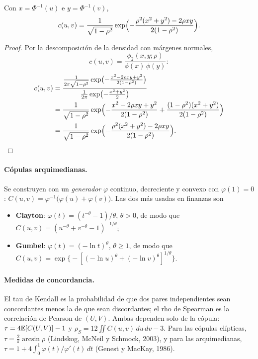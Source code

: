 \begin{proposicion}\label{prop:densgauss}
Con $x=\Phi^{-1}(u)$ e $y=\Phi^{-1}(v)$,
\[
  c(u,v)=\frac{1}{\sqrt{1-\rho^2}}\exp\Bigl(-\frac{\rho^2(x^2+y^2)-2\rho xy}{2(1-\rho^2)}\Bigr).
\]
\end{proposicion}

\begin{proof}
Por la descomposición de la densidad con márgenes normales,
\[
  c(u,v)=\frac{\phi_2(x,y;\rho)}{\phi(x)\,\phi(y)}:
\]
\begin{align*}
  c(u,v) &= \frac{\frac{1}{2\pi\sqrt{1-\rho^2}}\exp\bigl(-\frac{x^2-2\rho xy+y^2}{2(1-\rho^2)}\bigr)}{\frac{1}{2\pi}\exp\bigl(-\frac{x^2+y^2}{2}\bigr)}\\
         &= \frac{1}{\sqrt{1-\rho^2}}\exp\Bigl(-\frac{x^2-2\rho xy+y^2}{2(1-\rho^2)}+\frac{(1-\rho^2)(x^2+y^2)}{2(1-\rho^2)}\Bigr)\\
         &= \frac{1}{\sqrt{1-\rho^2}}\exp\Bigl(-\frac{\rho^2(x^2+y^2)-2\rho xy}{2(1-\rho^2)}\Bigr).
\end{align*}
\end{proof}

\paragraph{Cópulas arquimedianas.} Se construyen con un \emph{generador} $\varphi$ continuo, decreciente y convexo con
$\varphi(1)=0$: $C(u,v)=\varphi^{-1}\bigl(\varphi(u)+\varphi(v)\bigr)$. Las dos más usadas en finanzas son
\begin{itemize}[leftmargin=*]
  \item \textbf{Clayton}: $\varphi(t)=(t^{-\theta}-1)/\theta$, $\theta>0$, de modo que $C(u,v)=(u^{-\theta}+v^{-\theta}-1)^{-1/\theta}$;
  \item \textbf{Gumbel}: $\varphi(t)=(-\ln t)^\theta$, $\theta\ge1$, de modo que
        $C(u,v)=\exp\bigl\{-[(-\ln u)^\theta+(-\ln v)^\theta]^{1/\theta}\bigr\}$.
\end{itemize}

\paragraph{Medidas de concordancia.} El tau de Kendall es la probabilidad de que dos pares independientes sean
concordantes menos la de que sean discordantes; el rho de Spearman es la correlación de Pearson de $(U,V)$. Ambas
dependen solo de la cópula: $\tau=4\mathbb{E}[C(U,V)]-1$ y $\rho_S=12\iint C(u,v)\,du\,dv-3$. Para las cópulas elípticas,
$\tau=\frac2\pi\arcsin\rho$ (Lindskog, McNeil y Schmock, 2003), y para las arquimedianas, $\tau=1+4\int_0^1\varphi(t)/\varphi'(t)\,dt$
(Genest y MacKay, 1986).

